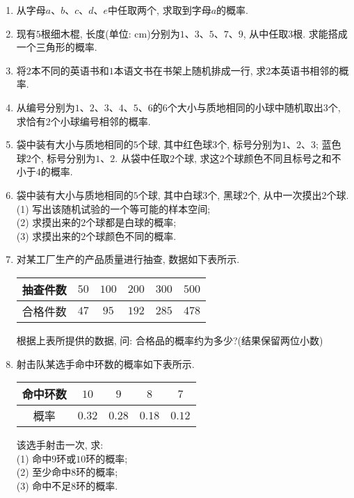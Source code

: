 \documentclass[10pt,a4paper]{article}
\begin{document}
\begin{enumerate}[1.]

\item 从字母$a$、$b$、$c$、$d$、$e$中任取两个, 求取到字母$a$的概率.
\vspace*{3cm}
\item 现有$5$根细木棍, 长度(单位: $\text{cm}$)分别为$1$、$3$、$5$、$7$、$9$, 从中任取$3$根. 求能搭成一个三角形的概率.
\vspace*{3cm}
\item 将$2$本不同的英语书和$1$本语文书在书架上随机排成一行, 求$2$本英语书相邻的概率. 
\vspace*{3cm}
\item 从编号分别为$1$、$2$、$3$、$4$、$5$、$6$的$6$个大小与质地相同的小球中随机取出$3$个, 求恰有$2$个小球编号相邻的概率.
\vspace*{3cm}
\item 袋中装有大小与质地相同的$5$个球, 其中红色球$3$个, 标号分别为$1$、$2$、$3$; 蓝色球$2$个, 标号分别为$1$、$2$. 从袋中任取$2$个球, 求这$2$个球颜色不同且标号之和不小于$4$的概率.
\vspace*{3cm}
\item 袋中装有大小与质地相同的$5$个球, 其中白球$3$个, 黑球$2$个, 从中一次摸出$2$个球.\\
(1) 写出该随机试验的一个等可能的样本空间;\\
(2) 求摸出来的$2$个球都是白球的概率;\\
(3) 求摸出来的$2$个球颜色不同的概率.
\vspace*{3cm}
\item 对某工厂生产的产品质量进行抽查, 数据如下表所示.
\begin{center}
    \begin{tabular}{|c|c|c|c|c|c|}
        \hline
        抽查件数 & $50$ & $100$ & $200$ & $300$ & $500$\\ \hline
        合格件数 & $47$ & $95$ & $192$ & $285$ & $478$\\ \hline        
    \end{tabular}
\end{center}
根据上表所提供的数据, 问: 合格品的概率约为多少?(结果保留两位小数)
\vspace*{3cm}
\item 射击队某选手命中环数的概率如下表所示.
\begin{center}
    \begin{tabular}{|c|c|c|c|c|}
        \hline
        命中环数 & $10$ & $9$ & $8$ & $7$\\ \hline
        概率 & $0.32$ & $0.28$ & $0.18$ & $0.12$ \\ \hline        
    \end{tabular}
\end{center}
该选手射击一次, 求:\\
(1) 命中$9$环或$10$环的概率;\\
(2) 至少命中$8$环的概率;\\
(3) 命中不足$8$环的概率. 
\vspace*{3cm}
\end{enumerate}
\end{document}
